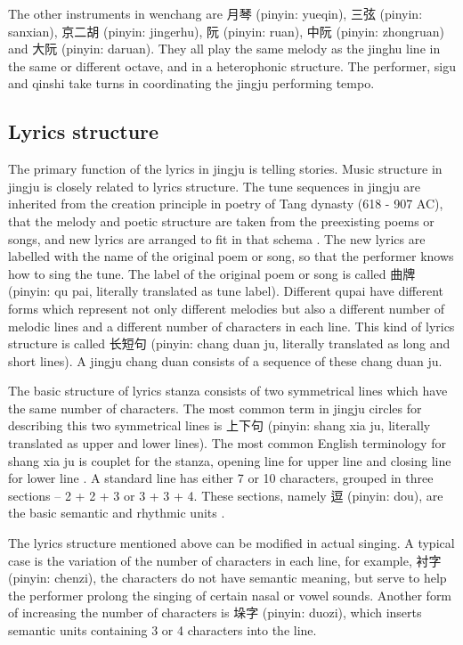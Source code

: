 The other instruments in wenchang are 月琴 (pinyin: yueqin), 三弦 (pinyin: sanxian), 京二胡 (pinyin: jingerhu), 阮 (pinyin: ruan), 中阮 (pinyin: zhongruan) and 大阮 (pinyin: daruan). They all play the same melody as the jinghu line in the same or different octave, and in a heterophonic structure. The performer, sigu and qinshi take turns in coordinating the jingju performing tempo.

\subsection{Lyrics structure}\label{sec:ch2:lyrics_structure}

The primary function of the lyrics in jingju is telling stories. Music structure in jingju is closely related to lyrics structure. The tune sequences in jingju are inherited from the creation principle in poetry of Tang dynasty (618 - 907 AC), that the melody and poetic structure are taken from the preexisting poems or songs, and new lyrics are arranged to fit in that schema \cite{Repetto2018}. The new lyrics are labelled with the name of the original poem or song, so that the performer knows how to sing the tune. The label of the original poem or song is called 曲牌 (pinyin: qu pai, literally translated as tune label). Different qupai have different forms which represent not only different melodies but also a different number of melodic lines and a different number of characters in each line. This kind of lyrics structure is called 长短句 (pinyin: chang duan ju, literally translated as long and short lines). A jingju chang duan consists of a sequence of these chang duan ju.

The basic structure of lyrics stanza consists of two symmetrical lines which have the same number of characters. The most common term in jingju circles for describing this two symmetrical lines is 上下句 (pinyin: shang xia ju, literally translated as upper and lower lines). The most common English terminology for shang xia ju is couplet for the stanza, opening line for upper line and closing line for lower line \cite{Repetto2018}. A standard line has either 7 or 10 characters, grouped in three sections -- 2 + 2 + 3 or 3 + 3 + 4. These sections, namely 逗 (pinyin: dou), are the basic semantic and rhythmic units \cite{Wichmann1991a}.

The lyrics structure mentioned above can be modified in actual singing. A typical case is the variation of the number of characters in each line, for example, 衬字 (pinyin: chenzi), the characters do not have semantic meaning, but serve to help the performer prolong the singing of certain nasal or vowel sounds. Another form of increasing the number of characters is 垛字 (pinyin: duozi), which inserts semantic units containing 3 or 4 characters into the line.

